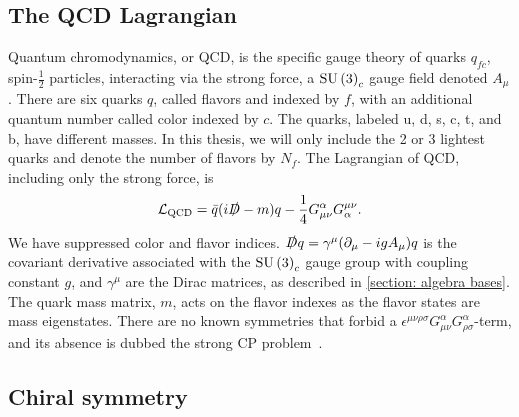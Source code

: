 \subsection{The QCD Lagrangian}

Quantum chromodynamics, or QCD, is the specific gauge theory of quarks $q_{fc}$, spin-$\frac{1}{2}$ particles, interacting via the strong force, a $\text{SU}\left(3\right)_c$ gauge field denoted $A_\mu$.
There are six quarks $q$, called flavors and indexed by $f$, with an additional quantum number called color indexed by $c$.
The quarks, labeled u, d, s, c, t, and b, have different masses.
In this thesis, we will only include the 2 or 3 lightest quarks and denote the number of flavors by $N_f$.
The Lagrangian of QCD, including only the strong force, is
%
\begin{equation}
    \mathcal{L}_{\text{QCD}} 
    = \bar q (i \slashed D - m)q - \frac{1}{4} G_{\mu \nu}^\alpha G^{\mu \nu}_\alpha.
\end{equation}
%
We have suppressed color and flavor indices.
$\slashed D q = \gamma^\mu (\partial_\mu - i g A_\mu) q$ is the covariant derivative associated with the $\text{SU}\left(3\right)_c$ gauge group with coupling constant $g$, and $\gamma^\mu$ are the Dirac matrices, as described in \autoref{section: algebra bases}.
The quark mass matrix, $m$, acts on the flavor indexes as the flavor states are mass eigenstates.
There are no known symmetries that forbid a $\epsilon^{\mu \nu \rho \sigma} G_{\mu \nu}^\alpha G_{\rho \sigma}^\alpha$-term, and its absence is dubbed the strong CP problem~\autocite{schwartzQuantumFieldTheory2013}.


\subsection{Chiral symmetry}


